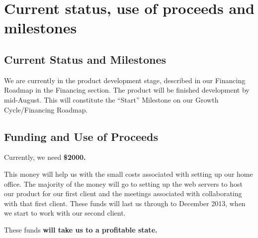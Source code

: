 \section{Current status, use of proceeds and milestones}

\subsection{Current Status and Milestones}
We are currently in the product development stage, described in our Financing Roadmap in the Financing section. The product will be finished development by mid-August. This will constitute the ``Start'' Milestone on our Growth Cycle/Financing Roadmap.

\subsection{Funding and Use of Proceeds}
Currently, we need {\bf \$2000. }

This money will help us with the small costs associated with setting up our home office. The majority of the money will go to setting up the web servers to host our product for our first client and the meetings associated with collaborating with that first client. These funds will last us through to December 2013, when we start to work with our second client.

These funds {\bf will take us to a profitable state.}